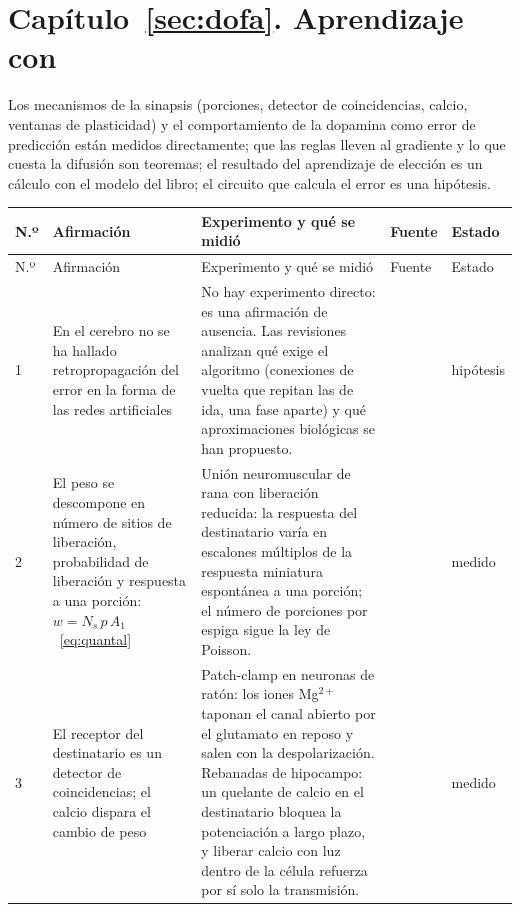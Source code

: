 \section{Capítulo~\ref{sec:dofa}. Aprendizaje con }

Los mecanismos de la sinapsis (porciones, detector de coincidencias, calcio, ventanas de plasticidad) y el comportamiento de la dopamina como error de predicción están medidos directamente; que las reglas lleven al gradiente y lo que cuesta la difusión son teoremas; el resultado del aprendizaje de elección es un cálculo con el modelo del libro; el circuito que calcula el error es una hipótesis.

{\footnotesize
\setlength{\tabcolsep}{3pt}\renewcommand{\arraystretch}{1.15}
\begin{longtable}{>{\raggedright}p{0.5cm}>{\raggedright}p{4.0cm}>{\raggedright}p{5.6cm}>{\raggedright}p{2.3cm}>{\raggedright\arraybackslash}p{1.7cm}}
\toprule
N.º & Afirmación & Experimento y qué se midió & Fuente & Estado \\
\midrule\endfirsthead
\toprule
N.º & Afirmación & Experimento y qué se midió & Fuente & Estado \\
\midrule\endhead
1 & En el cerebro no se ha hallado retropropagación del error en la forma de las redes artificiales & No hay experimento directo: es una afirmación de ausencia. Las revisiones analizan qué exige el algoritmo (conexiones de vuelta que repitan las de ida, una fase aparte) y qué aproximaciones biológicas se han propuesto. & \cite{Lillicrap2020, WhittingtonBogacz2019} & hipótesis \\
2 & El peso se descompone en número de sitios de liberación, probabilidad de liberación y respuesta a una porción: $w=N_s\,p\,A_1$~\eqref{eq:quantal} & Unión neuromuscular de rana con liberación reducida: la respuesta del destinatario varía en escalones múltiplos de la respuesta miniatura espontánea a una porción; el número de porciones por espiga sigue la ley de Poisson. & \cite{delCastillo1954} & medido \\
3 & El receptor del destinatario es un detector de coincidencias; el calcio dispara el cambio de peso & Patch-clamp en neuronas de ratón: los iones Mg$^{2+}$ taponan el canal abierto por el glutamato en reposo y salen con la despolarización. Rebanadas de hipocampo: un quelante de calcio en el destinatario bloquea la potenciación a largo plazo, y liberar calcio con luz dentro de la célula refuerza por sí solo la transmisión. & \cite{Nowak1984, Malenka1988calcium} & medido \\

\end{longtable}}
